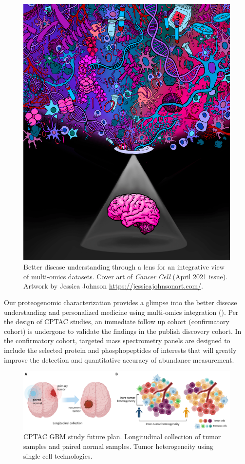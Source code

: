\begin{figure}[tb]
    \centering
    \includegraphics[width=0.6\linewidth]{figures/chap05_conclusion/cptac_gbm_cancer_cell_cover.png}
    \caption[Better disease understanding through a lens for an integrative view of multi-omics datasets.]{Better disease understanding through a lens for an integrative view of multi-omics datasets. Cover art of \textit{Cancer Cell} (April 2021 issue). Artwork by Jessica Johnson \url{https://jessicajohnsonart.com/}.}
    \label{fig:lens-multi-omics}
\end{figure}

Our proteogenomic characterization provides a glimpse into the better disease understanding and personalized medicine using multi-omics integration (). Per the design of CPTAC studies, an immediate follow up cohort (confirmatory cohort) is undergone to validate the findings in the publish discovery cohort. In the confirmatory cohort, targeted mass spectrometry panels are designed to include the selected protein and phosphopeptides of interests that will greatly improve the detection and quantitative accuracy of abundance measurement.


\begin{figure}[tb]
    \centering
    \includegraphics[width=1\linewidth]{figures/chap05_conclusion/gbm_future_plan.pdf}
    \caption[CPTAC GBM study future plan.]{%
        CPTAC GBM study future plan.
         Longitudinal collection of tumor samples and paired normal samples.
         Tumor heterogeneity using single cell technologies.
    }
    \label{fig:cptac-gbm-future-plan}
\end{figure}

